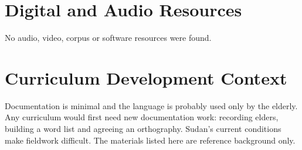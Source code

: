 \documentclass[12pt]{article}
\begin{document}
\section{Digital and Audio Resources}
No audio, video, corpus or software resources were found.

\section{Curriculum Development Context}
Documentation is minimal and the language is probably used only by the elderly. Any curriculum would first need new documentation work: recording elders, building a word list and agreeing an orthography. Sudan's current conditions make fieldwork difficult. The materials listed here are reference background only.
\end{document}
